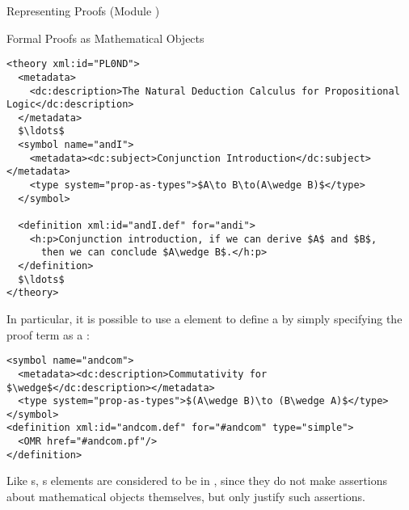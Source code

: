 \begin{omgroup}[id=proofs,short=Representing Proofs]{Representing Proofs (Module {})}
\begin{module}[id=proofobjects]
\begin{omgroup}[id=proofobjects]{Formal Proofs as Mathematical Objects}
\begin{lstlisting}[label=lst:plnd,mathescape,
  caption={A Theory for Propositional Natural Deduction}]
<theory xml:id="PL0ND">
  <metadata>
    <dc:description>The Natural Deduction Calculus for Propositional Logic</dc:description>
  </metadata>
  $\ldots$
  <symbol name="andI">
    <metadata><dc:subject>Conjunction Introduction</dc:subject></metadata>
    <type system="prop-as-types">$A\to B\to(A\wedge B)$</type>
  </symbol>

  <definition xml:id="andI.def" for="andi">
    <h:p>Conjunction introduction, if we can derive $A$ and $B$, 
      then we can conclude $A\wedge B$.</h:p>
  </definition>
  $\ldots$
</theory>
\end{lstlisting}

In particular, it is possible to use a {}
element to define a {} by simply specifying the proof
term as a {}:
\begin{lstlisting}[mathescape]
<symbol name="andcom">
  <metadata><dc:description>Commutativity for $\wedge$</dc:description></metadata>
  <type system="prop-as-types">$(A\wedge B)\to (B\wedge A)$</type>
</symbol>
<definition xml:id="andcom.def" for="#andcom" type="simple">
  <OMR href="#andcom.pf"/>
</definition>
\end{lstlisting}
Like {s}, {s} elements are considered to be
 in {\omdoc}, since they do not make
assertions about mathematical objects themselves, but only justify such assertions.
\end{omgroup}
\end{module}
\end{omgroup}


